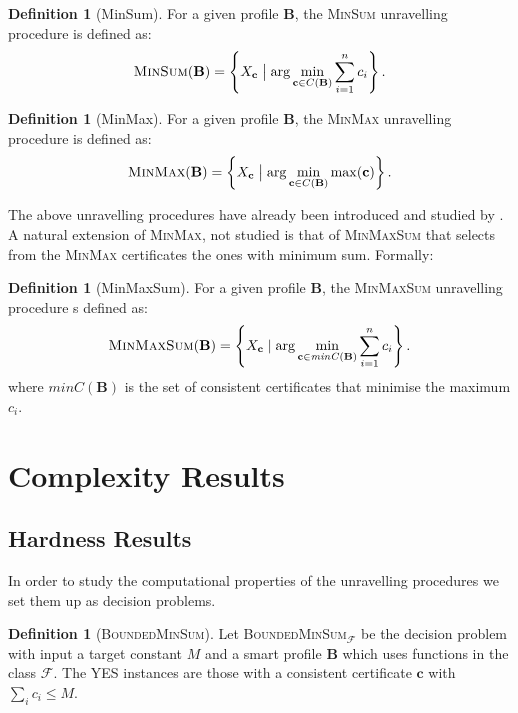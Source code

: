 \documentclass[11pt,a4paper, titlepage]{article}
\theoremstyle{definition}
\newtheorem{definition}[theorem]{Definition}
\let\vec\mathbf
\begin{document}
\begin{definition}[MinSum]
    For a given profile $\mathbf{B}$, the \textsc{MinSum} unravelling procedure is defined as:
    \[
        \textsc{MinSum}(\mathbf{B}) = 
        \left\{X_{\mathbf{c}} \bigm| \mathrm{arg} \min_{\mathbf{c} \in C(\mathbf{B})} \sum_{i=1}^n c_i\right\}.
    \]
\end{definition}

\begin{definition}[MinMax]
    For a given profile $\mathbf{B}$, the \textsc{MinMax} unravelling procedure is defined as:
    \[
        \textsc{MinMax}(\mathbf{B}) = \left\{X_{\mathbf{c}} \bigm| \mathrm{arg} \min_{\mathbf{c} \in C(\mathbf{B})} \max (\mathbf{c}) \right\}.
    \]
\end{definition}

The above unravelling procedures have already been introduced and studied by  \cite{grandi}. 
A natural extension of \textsc{MinMax}, not studied is that of \textsc{MinMaxSum} that selects from the \textsc{MinMax} certificates the ones with minimum sum. 
Formally:

\begin{definition}[MinMaxSum]
    For a given profile $\mathbf{B}$, the \textsc{MinMaxSum} unravelling procedure s defined as:
    \[
        \textsc{MinMaxSum}(\mathbf{B}) =  \left\{ X_{\mathbf{c}}\mid \arg  \min_{\vec{c} \in \mathit{minC}(\mathbf{B})} \sum_{i=1}^n c_i \right\}.
    \]
    where $\mathit{minC}(\vec{B})$ is the set of consistent certificates that minimise the maximum $c_i$. 
\end{definition}


\newpage



\section{Complexity Results}

\subsection{Hardness Results}

In order to study the computational properties of the unravelling procedures we set them up as decision problems.

\begin{definition}[\textsc{BoundedMinSum}]
    Let \textsc{BoundedMinSum}$_\mathcal{F}$ be the decision problem with input a target constant $M$ and a smart profile $\mathbf{B}$ which uses functions in the class $\mathcal{F}$. 
    The YES instances are those with a consistent certificate  $\vec{c}$ with $\sum_i c_i \leq M$. 
\end{definition}
\end{document}
